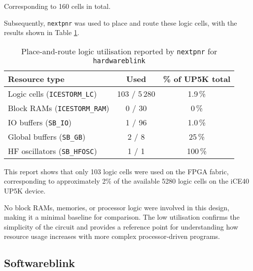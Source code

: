 \documentclass[a4paper,10pt]{article}
\begin{document}
Corresponding to 160 cells in total.

Subsequently, \texttt{nextpnr} was used to place and route these logic cells,
with the results shown in Table \ref{tab:hardware_pnr_report}.

\begin{table}[H]
    \centering
    \begin{tabularx}{0.7\textwidth}{X c c}
        \toprule
        Resource type & Used & \% of UP5K total \\ \midrule
        Logic cells (\texttt{ICESTORM\_LC}) & 103 / 5\,280 & 1.9\,\% \\
        Block RAMs (\texttt{ICESTORM\_RAM}) & 0 / 30 & 0\,\% \\
        IO buffers (\texttt{SB\_IO}) & 1 / 96 & 1.0\,\% \\
        Global buffers (\texttt{SB\_GB}) & 2 / 8  & 25\,\% \\
        HF oscillators (\texttt{SB\_HFOSC}) & 1 / 1  & 100\,\% \\ 
    \bottomrule
    \end{tabularx}
    \caption{Place-and-route logic utilisation reported by 
    \texttt{nextpnr} for \texttt{hardwareblink}}
    \label{tab:hardware_pnr_report}
\end{table}

This report shows that only 103 logic cells were used on the FPGA fabric, 
corresponding to approximately 2\% of the available 5280 logic cells 
on the iCE40 UP5K device.


No block RAMs, memories, or processor logic were involved in this design, 
making it a minimal baseline for comparison. 
The low utilisation confirms the simplicity of the circuit 
and provides a reference point for understanding 
how resource usage increases with more complex processor-driven programs.


\subsection{Softwareblink}
\label{sec:Softwareblink}
\end{document}
